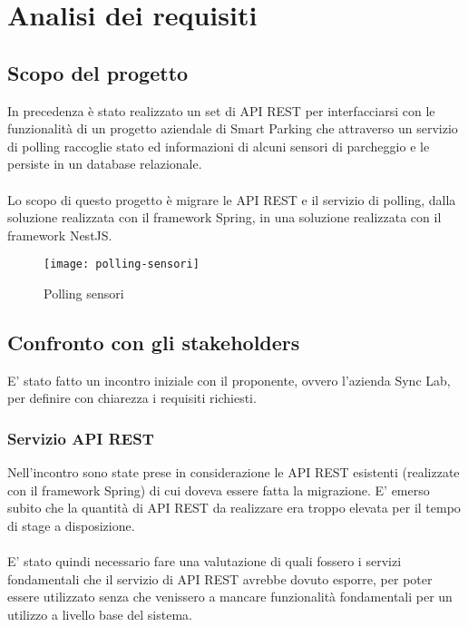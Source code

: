
\chapter{Analisi dei requisiti}
\label{cap:analisi-requisiti}

\section{Scopo del progetto}
In precedenza è stato realizzato un set di \gls{API} \gls{REST} per interfacciarsi con le funzionalità
di un progetto aziendale di Smart Parking che attraverso un servizio di polling raccoglie 
stato ed informazioni di alcuni sensori di parcheggio e le persiste in un database relazionale.
\\\\
Lo scopo di questo progetto è migrare le \gls{API} \gls{REST} e il servizio di polling, dalla soluzione
realizzata con il framework Spring, in una soluzione realizzata con il framework NestJS.
\begin{figure}[H]
    \centering
    \texttt{[image: polling-sensori]}
    \caption{Polling sensori}
\end{figure}
\leavevmode\newline

\section{Confronto con gli stakeholders}
E' stato fatto un incontro iniziale con il proponente, ovvero l'azienda Sync Lab,
per definire con chiarezza i requisiti richiesti.
\subsection{Servizio API REST}
Nell'incontro sono state prese in considerazione le \gls{API} \gls{REST} esistenti (realizzate con il framework Spring) 
di cui doveva essere fatta la migrazione.
E' emerso subito che la quantità di \gls{API} \gls{REST} da realizzare era troppo elevata per il
tempo di stage a disposizione. 
\\\\
E' stato quindi necessario fare una valutazione di quali fossero i servizi fondamentali che
il servizio di \gls{API} \gls{REST} avrebbe dovuto esporre, per poter essere utilizzato senza che venissero
a mancare funzionalità fondamentali per un utilizzo a livello base del sistema.

